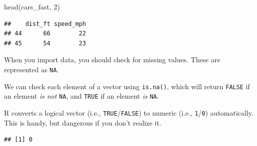 \documentclass[
  11pt,
  a4paper,
]{book}
\newenvironment{Shaded}{\begin{snugshade}}{\end{snugshade}}
\newcommand{\ConstantTok}[1]{\textcolor[rgb]{0.00,0.00,0.00}{#1}}
\newcommand{\DecValTok}[1]{\textcolor[rgb]{0.00,0.00,0.81}{#1}}
\newcommand{\FunctionTok}[1]{\textcolor[rgb]{0.00,0.00,0.00}{#1}}
\newcommand{\NormalTok}[1]{#1}
\newcommand{\OtherTok}[1]{\textcolor[rgb]{0.56,0.35,0.01}{#1}}
\newcommand{\SpecialCharTok}[1]{\textcolor[rgb]{0.00,0.00,0.00}{#1}}
\begin{document}
\begin{Shaded}
\begin{Highlighting}[]
\FunctionTok{head}\NormalTok{(cars\_fast, }\DecValTok{2}\NormalTok{)}
\end{Highlighting}
\end{Shaded}

\begin{verbatim}
##    dist_ft speed_mph
## 44      66        22
## 45      54        23
\end{verbatim}

When you import data, you should check for missing values. These are represented as \texttt{NA}.

We can check each element of a vector using \texttt{is.na()}, which will return \texttt{FALSE} if an element \emph{is not} \texttt{NA}, and \texttt{TRUE} if an element \emph{is} \texttt{NA}.

\begin{Shaded}
\end{Shaded}

R converts a logical vector (i.e., \texttt{TRUE}/\texttt{FALSE}) to numeric (i.e., \texttt{1}/\texttt{0}) automatically. This is handy, but dangerous if you don't realize it.

\begin{Shaded}
\end{Shaded}

\begin{verbatim}
## [1] 0
\end{verbatim}

\begin{Shaded}
\end{Shaded}
\end{document}
